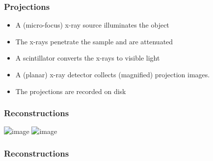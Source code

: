 \begin{frame}
  \frametitle{Projections}
  \begin{itemize}
    \item A (micro-focus) x-ray source illuminates the object
    \item The x-rays penetrate the sample and are attenuated
    \item A scintillator converts the x-rays to visible light
    \item A (planar) x-ray detector collects (magnified) projection images.
    \item The projections are recorded on disk
  \end{itemize}
\end{frame}

\begin{frame}
  \frametitle{Reconstructions}
  \centering
  \includegraphics<1|handout:1>[height=\imageheight]{./images/2214/NRecon_proj}%
  \includegraphics<2|handout:2>[height=\imageheight]{./images/2214/NRecon_rec}%
\end{frame}

\begin{frame}
  \frametitle{Reconstructions}
  \centering
\end{frame}

